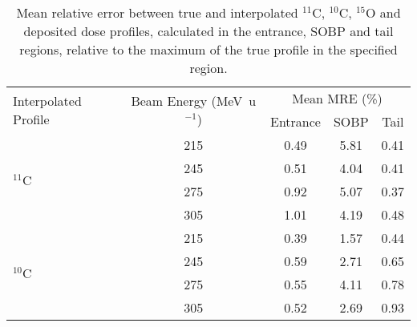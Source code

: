 \documentclass[demo]{OUP-EJ}
\begin{document}
\begin{table}[t]
\centering\caption{Mean relative error between true and interpolated $^{11}$C, $^{10}$C, $^{15}$O and deposited dose profiles, calculated in the entrance, SOBP and tail regions, relative to the maximum of the true profile in the specified region.}\label{tab:prof_interp_validation}
\begin{tabular}{@{}lcccc@{}}
\hline
\multirow{2}{*}{Interpolated Profile}	&\multirow{2}{*}{Beam Energy (MeV\ u$^{-1}$)} & \multicolumn{3}{c}{Mean MRE (\%)}\\
\cline{3-5}
& & Entrance & SOBP & Tail \\
\hline
\multirow{4}{*}{$^{11}$C} & 215 & 0.49 & 5.81 & 0.41 \\
& 245 & 0.51 & 4.04 & 0.41 \\
& 275 & 0.92 & 5.07 & 0.37 \\
& 305 & 1.01 & 4.19 & 0.48 \\
\multirow{4}{*}{$^{10}$C} & 215 & 0.39 & 1.57 & 0.44 \\
& 245 & 0.59 & 2.71 & 0.65 \\
& 275 & 0.55 & 4.11 & 0.78 \\
& 305 & 0.52 & 2.69 & 0.93 \\
\hline
\end{tabular}
\end{table}




\nocite{*}




\end{document}
